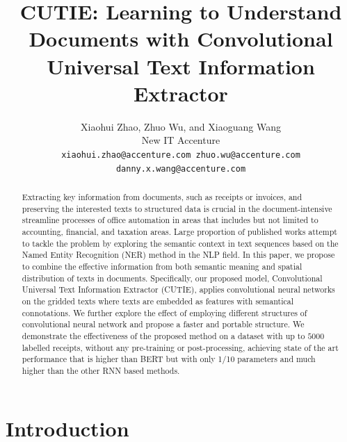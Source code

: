 \documentclass[10pt,twocolumn,letterpaper]{article}
\begin{document}
\title{CUTIE: Learning to Understand Documents with Convolutional Universal Text Information Extractor}

\author{
  Xiaohui Zhao, Zhuo Wu, and Xiaoguang Wang \\
  New IT Accenture \\
{\tt\small xiaohui.zhao@accenture.com zhuo.wu@accenture.com danny.x.wang@accenture.com}
}

\maketitle

\begin{abstract}
   Extracting key information from documents, such as receipts or invoices, and preserving the interested texts to structured data is crucial in the document-intensive streamline processes of office automation in areas that includes but not limited to accounting, financial, and taxation areas. Large proportion of published works attempt to tackle the problem by exploring the semantic context in text sequences based on the Named Entity Recognition (NER) method in the NLP field. In this paper, we propose to combine the effective information from both semantic meaning and spatial distribution of texts in documents. Specifically, our proposed model, Convolutional Universal Text Information Extractor (CUTIE), applies convolutional neural networks on the gridded texts where texts are embedded as features with semantical connotations. We further explore the effect of employing different structures of convolutional neural network and propose a faster and portable structure. We demonstrate the effectiveness of the proposed method on a dataset with up to $5000$ labelled receipts, without any pre-training or post-processing, achieving state of the art performance that is higher than BERT but with only 1/10 parameters and much higher than the other RNN based methods.
\end{abstract}

\section{Introduction}
\end{document}
